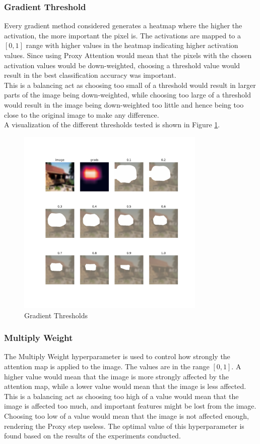 \subsubsection{Gradient Threshold}
Every gradient method considered generates a heatmap where the higher the activation, the more important the pixel is. The activations are mapped to a $[0,1]$ range with higher values in the heatmap indicating higher activation values. Since using Proxy Attention would mean that the pixels with the chosen activation values would be down-weighted, choosing a threshold value would result in the best classification accuracy was important.\\
This is a balancing act as choosing too small of a threshold would result in larger parts of the image being down-weighted, while choosing too large of a threshold would result in the image being down-weighted too little and hence being too close to the original image to make any difference.\\
A visualization of the different thresholds tested is shown in Figure \ref{fig:thresholds}.

\begin{figure}[h]
    \centering
    \includegraphics[width=0.8\textwidth]{images/grad_threshold.pdf}
    \caption{Gradient Thresholds}
    \label{fig:thresholds}
\end{figure}

\subsubsection{Multiply Weight}
The Multiply Weight hyperparameter is used to control how strongly the attention map is applied to the image. The values are in the range $[0,1]$. A higher value would mean that the image is more strongly affected by the attention map, while a lower value would mean that the image is less affected. This is a balancing act as choosing too high of a value would mean that the image is affected too much, and important features might be lost from the image. Choosing too low of a value would mean that the image is not affected enough, rendering the Proxy step useless. The optimal value of this hyperparameter is found based on the results of the experiments conducted.

